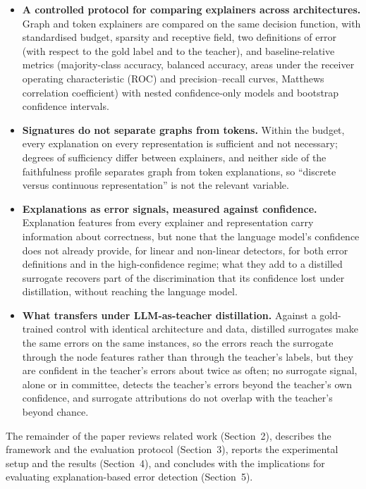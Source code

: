 \begin{itemize}
    \item \textbf{A controlled protocol for comparing explainers across architectures.} Graph and token explainers are compared on the same decision function, with standardised budget, sparsity and receptive field, two definitions of error (with respect to the gold label and to the teacher), and baseline-relative metrics (majority-class accuracy, balanced accuracy, areas under the receiver operating characteristic (ROC) and precision--recall curves, Matthews correlation coefficient) with nested confidence-only models and bootstrap confidence intervals.
    \item \textbf{Signatures do not separate graphs from tokens.} Within the budget, every explanation on every representation is sufficient and not necessary; degrees of sufficiency differ between explainers, and neither side of the faithfulness profile separates graph from token explanations, so ``discrete versus continuous representation'' is not the relevant variable.
    \item \textbf{Explanations as error signals, measured against confidence.} Explanation features from every explainer and representation carry information about correctness, but none that the language model's confidence does not already provide, for linear and non-linear detectors, for both error definitions and in the high-confidence regime; what they add to a distilled surrogate recovers part of the discrimination that its confidence lost under distillation, without reaching the language model.
    \item \textbf{What transfers under LLM-as-teacher distillation.} Against a gold-trained control with identical architecture and data, distilled surrogates make the same errors on the same instances, so the errors reach the surrogate through the node features rather than through the teacher's labels, but they are confident in the teacher's errors about twice as often; no surrogate signal, alone or in committee, detects the teacher's errors beyond the teacher's own confidence, and surrogate attributions do not overlap with the teacher's beyond chance.
\end{itemize}

The remainder of the paper reviews related work (Section~2), describes the framework and the evaluation protocol (Section~3), reports the experimental setup and the results (Section~4), and concludes with the implications for evaluating explanation-based error detection (Section~5).
